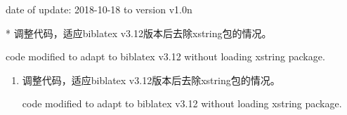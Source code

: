 


date of update: 2018-10-18 to version v1.0n

* 调整代码，适应biblatex v3.12版本后去除xstring包的情况。

code modified to adapt to biblatex v3.12 without loading xstring package.

\label{up:181018}
\begin{enumerate}

\item 调整代码，适应biblatex v3.12版本后去除xstring包的情况。

code modified to adapt to biblatex v3.12 without loading xstring package.


\end{enumerate}


